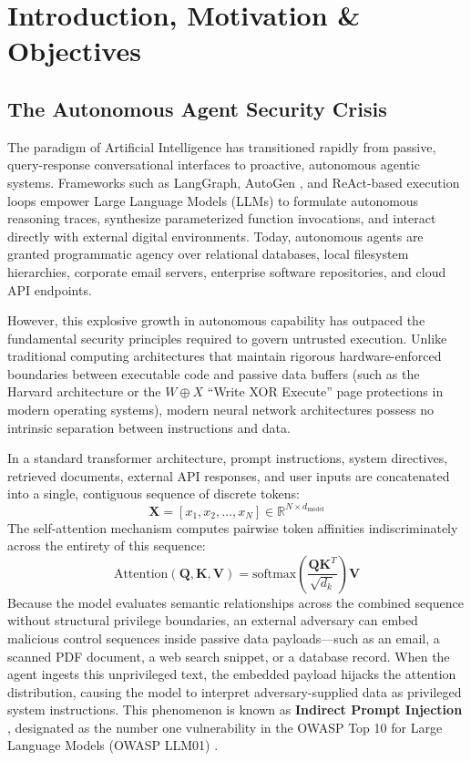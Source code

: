 \chapter{Introduction, Motivation \& Objectives}
\label{chap:intro}

\section{The Autonomous Agent Security Crisis}
The paradigm of Artificial Intelligence has transitioned rapidly from passive, query-response conversational interfaces to proactive, autonomous agentic systems. Frameworks such as LangGraph, AutoGen \cite{wu2023autogen}, and ReAct-based execution loops \cite{yao2023react} empower Large Language Models (LLMs) to formulate autonomous reasoning traces, synthesize parameterized function invocations, and interact directly with external digital environments. Today, autonomous agents are granted programmatic agency over relational databases, local filesystem hierarchies, corporate email servers, enterprise software repositories, and cloud API endpoints.

However, this explosive growth in autonomous capability has outpaced the fundamental security principles required to govern untrusted execution. Unlike traditional computing architectures that maintain rigorous hardware-enforced boundaries between executable code and passive data buffers (such as the Harvard architecture or the $W \oplus X$ ``Write XOR Execute'' page protections in modern operating systems), modern neural network architectures possess no intrinsic separation between instructions and data. 

In a standard transformer architecture, prompt instructions, system directives, retrieved documents, external API responses, and user inputs are concatenated into a single, contiguous sequence of discrete tokens:
\begin{equation}
\mathbf{X} = [x_1, x_2, \dots, x_N] \in \mathbb{R}^{N \times d_{\text{model}}}
\end{equation}
The self-attention mechanism computes pairwise token affinities indiscriminately across the entirety of this sequence:
\begin{equation}
\text{Attention}(\mathbf{Q}, \mathbf{K}, \mathbf{V}) = \text{softmax}\left(\frac{\mathbf{Q}\mathbf{K}^T}{\sqrt{d_k}}\right)\mathbf{V}
\end{equation}
Because the model evaluates semantic relationships across the combined sequence without structural privilege boundaries, an external adversary can embed malicious control sequences inside passive data payloads—such as an email, a scanned PDF document, a web search snippet, or a database record. When the agent ingests this unprivileged text, the embedded payload hijacks the attention distribution, causing the model to interpret adversary-supplied data as privileged system instructions. This phenomenon is known as \textbf{Indirect Prompt Injection} \cite{greshake2023indirect, ribeiro2024bipia}, designated as the number one vulnerability in the OWASP Top 10 for Large Language Models (OWASP LLM01) \cite{owasp2025top10llm}.

